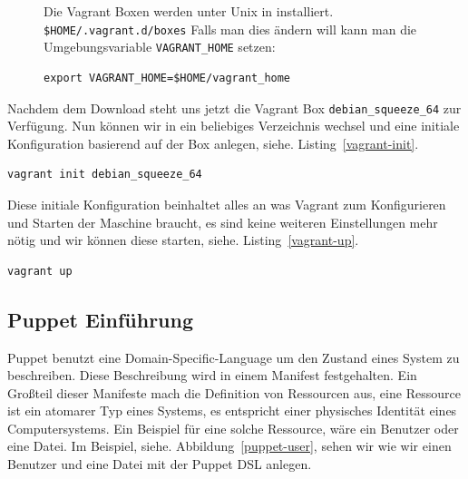 \documentclass[12pt,a4paper,ngerman]{article}
\newcommand{\reffig}[1]{, siehe. Abbildung~\ref{#1}}
\newcommand{\reflst}[1]{, siehe. Listing~\ref{#1}}
\begin{document}
\begin{figure}
\vspace{-20pt}
\begin{boxedminipage}{4.5cm}
 Die Vagrant Boxen werden unter Unix in installiert. \lstinline!$HOME/.vagrant.d/boxes!
Falls man dies ändern will kann man die Umgebungsvariable \lstinline$VAGRANT_HOME$ setzen:
\begin{lstlisting}[label=vagrant-home,frame=none,numbers=none]
export VAGRANT_HOME=$HOME/vagrant_home
\end{lstlisting}
\end{boxedminipage}
\vspace{-20pt}
\end{figure}
  

Nachdem dem Download steht uns jetzt die  Vagrant Box \lstinline$debian_squeeze_64$ zur Verfügung. Nun können wir in ein beliebiges Verzeichnis wechsel und eine initiale Konfiguration basierend auf der Box anlegen\reflst{vagrant-init}.

\begin{lstlisting}[caption=Vagrant initialisieren, label=vagrant-init]
vagrant init debian_squeeze_64
\end{lstlisting}

Diese initiale Konfiguration beinhaltet alles an was Vagrant zum Konfigurieren und Starten der Maschine braucht, es sind keine weiteren Einstellungen mehr nötig und wir können diese starten\reflst{vagrant-up}.

\begin{lstlisting}[caption=Starten der Vagrant Maschine, label=vagrant-up]
vagrant up
\end{lstlisting}

\subsection{Puppet Einführung}

Puppet benutzt eine Domain-Specific-Language um den Zustand eines System zu beschreiben. Diese Beschreibung wird in einem Manifest festgehalten. Ein Großteil dieser Manifeste mach die Definition von Ressourcen aus, eine Ressource ist ein atomarer Typ eines Systems, es entspricht einer physisches Identität eines Computersystems. Ein Beispiel für eine solche Ressource, wäre ein Benutzer oder eine Datei. Im Beispiel\reffig{puppet-user}, sehen wir wie wir einen Benutzer und eine Datei mit der Puppet DSL anlegen.
\end{document}
